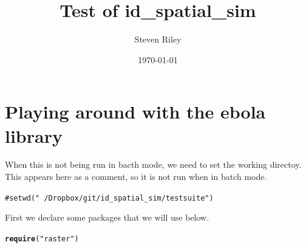 \documentclass{article}\usepackage{graphicx, color}
\title{Test of id\_spatial\_sim}
\author{Steven Riley}
\date{\today}
\makeatletter
\newcommand{\hlfunctioncall}[1]{\textcolor[rgb]{0.501960784313725,0,0.329411764705882}{\textbf{#1}}}%
\newcommand{\hlstring}[1]{\textcolor[rgb]{0.6,0.6,1}{#1}}%
\newcommand{\hlcomment}[1]{\textcolor[rgb]{0.180392156862745,0.6,0.341176470588235}{#1}}%
\newenvironment{kframe}{%
 \def\at@end@of@kframe{}%
 \ifinner\ifhmode%
  \def\at@end@of@kframe{\end{minipage}}%
  \begin{minipage}{\columnwidth}%
 \fi\fi%
 \def\FrameCommand##1{\hskip\@totalleftmargin \hskip-\fboxsep
 \colorbox{shadecolor}{##1}\hskip-\fboxsep
     \hskip-\linewidth \hskip-\@totalleftmargin \hskip\columnwidth}%
 \MakeFramed {\advance\hsize-\width
   \@totalleftmargin\z@ \linewidth\hsize
   \@setminipage}}%
 {\par\unskip\endMakeFramed%
 \at@end@of@kframe}
\newenvironment{knitrout}{}{} %
\makeatother
\begin{document}




\maketitle




\newpage

\section{Playing around with the ebola library}

When this is not being run in bacth mode, we need to set the working directoy.
This appears here as a comment, so it is not run when in batch mode.

\begin{knitrout}
\color{fgcolor}\begin{kframe}
\begin{alltt}
\hlcomment{# setwd("~/Dropbox/git/id_spatial_sim/testsuite")}
\end{alltt}
\end{kframe}
\end{knitrout}


First we declare some packages that we will use below.

\begin{knitrout}
\color{fgcolor}\begin{kframe}
\begin{alltt}
\hlfunctioncall{require}(\hlstring{"raster"})
\end{alltt}


{\ttfamily\noindent\itshape\color{messagecolor}{\#\# Loading required package: raster}}

{\ttfamily\noindent\itshape\color{messagecolor}{\#\# Loading required package: methods}}

{\ttfamily\noindent\itshape\color{messagecolor}{\#\# Loading required package: sp}}\end{kframe}
\end{knitrout}
\end{document}

